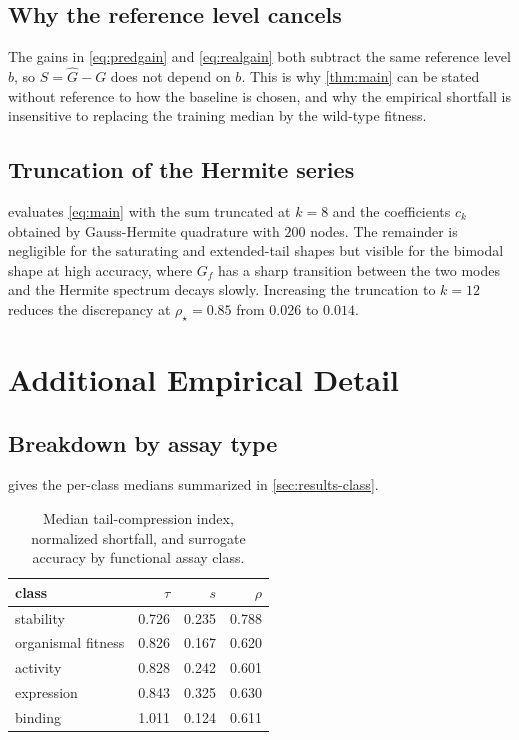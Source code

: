 \documentclass{article}
\theoremstyle{plain}
\theoremstyle{definition}
\begin{document}
\subsection{Why the reference level cancels}
\label{app:base}

The gains in \cref{eq:predgain} and \cref{eq:realgain} both subtract the same reference
level $b$, so $S = \hat{G} - G$ does not depend on $b$. This is why
\cref{thm:main} can be stated without reference to how the baseline is chosen, and why
the empirical shortfall is insensitive to replacing the training median by the
wild-type fitness.

\subsection{Truncation of the Hermite series}
\label{app:trunc}

 evaluates \cref{eq:main} with the sum truncated at $k = 8$ and the
coefficients $c_k$ obtained by Gauss-Hermite quadrature with $200$ nodes. The remainder
is negligible for the saturating and extended-tail shapes but visible for the bimodal
shape at high accuracy, where $G_{\!f}$ has a sharp transition between the two modes and
the Hermite spectrum decays slowly. Increasing the truncation to $k = 12$ reduces the
discrepancy at $\rho_\star = 0.85$ from $0.026$ to $0.014$.

\section{Additional Empirical Detail}
\label{app:empirical}

\subsection{Breakdown by assay type}
\label{app:class}

 gives the per-class medians summarized in \cref{sec:results-class}.

\begin{table}[h]
\caption{Median tail-compression index, normalized shortfall, and surrogate accuracy by
functional assay class.}
\label{tab:class}
\vskip 0.1in
\begin{center}
\begin{small}
\begin{tabular}{lrrr}
\toprule
class & $\tau$ & $s$ & $\rho$ \\
\midrule
stability          & 0.726 & 0.235 & 0.788 \\
organismal fitness & 0.826 & 0.167 & 0.620 \\
activity           & 0.828 & 0.242 & 0.601 \\
expression         & 0.843 & 0.325 & 0.630 \\
binding            & 1.011 & 0.124 & 0.611 \\
\bottomrule
\end{tabular}
\end{small}
\end{center}
\end{table}
\end{document}
